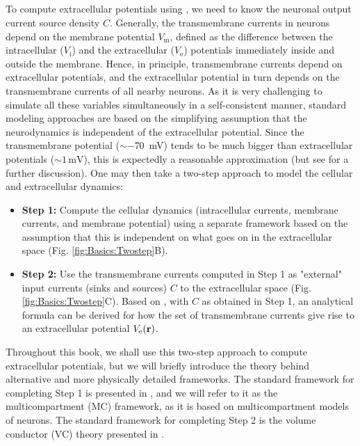 \subsection{}
\label{sec:Basics:twostep}
To compute extracellular potentials using , we need to know the neuronal output current source density $C$. Generally, the transmembrane currents in neurons depend on the membrane potential $V_\text{m}$, defined as the difference between the intracellular ($V_\text{i}$) and the extracellular ($V_\text{e}$) potentials immediately inside and outside the membrane. Hence, in principle, transmembrane currents depend on extracellular potentials, and the extracellular potential in turn depends on the transmembrane currents of all nearby neurons. As it is very challenging to simulate all these variables simultaneously in a self-consistent manner, standard modeling approaches are based on the simplifying assumption that the neurodynamics is independent of the extracellular potential. Since the transmembrane potential ($\sim -70$~\si{\milli\volt}) tends to be much bigger than extracellular potentials ($\sim 1 \,\si{\milli\volt}$), this is expectedly a reasonable approximation (but see  for a further discussion). One may then take a two-step approach to model the cellular and extracellular dynamics:

\begin{itemize}
\item {\bf Step 1:} Compute the cellular dynamics (intracellular currents, membrane currents, and membrane potential) using a separate framework based on the assumption that this is independent on what goes on in the extracellular space (Fig. \ref{fig:Basics:Twostep}B).

\item {\bf Step 2:} Use the transmembrane currents computed in Step 1 as "external" input currents (sinks and sources) $C$ to the extracellular space (Fig. \ref{fig:Basics:Twostep}C). Based on , with $C$ as obtained in Step 1, an analytical formula can be derived for how the set of transmembrane currents give rise to an extracellular potential $V_\text{e}({\bf r})$.
\end{itemize}

Throughout this book, we shall use this two-step approach to compute extracellular potentials, but we will briefly introduce the theory behind alternative and more physically detailed frameworks. The standard framework for completing Step 1 is presented in , and we will refer to it as the multicompartment (MC) framework, as it is based on multicompartment models of neurons. The standard framework for completing Step 2 is the volume conductor (VC) theory presented in  .



